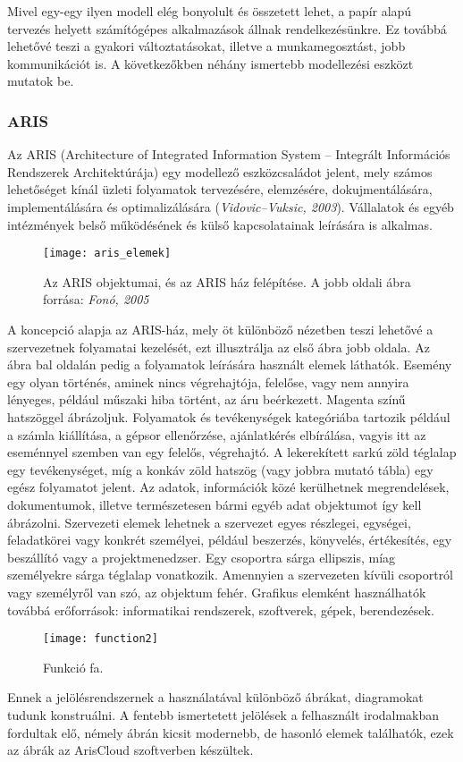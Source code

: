 \documentclass[12pt]{article}
\begin{document}
Mivel egy-egy ilyen modell elég bonyolult és összetett lehet, a papír alapú tervezés helyett számítógépes alkalmazások állnak rendelkezésünkre. Ez továbbá lehetővé teszi a gyakori változtatásokat, illetve a munkamegosztást, jobb kommunikációt is. A következőkben néhány ismertebb modellezési eszközt mutatok be.

\subsubsection{ARIS}

Az ARIS (Architecture of Integrated Information System – Integrált Információs Rendszerek Architektúrája) egy modellező eszközcsaládot jelent, mely számos lehetőséget kínál üzleti folyamatok tervezésére, elemzésére, dokujmentálására, implementálására és optimalizálására (\textit{Vidovic–Vuksic, 2003}). Vállalatok és egyéb intézmények belső működésének és külső kapcsolatainak leírására is alkalmas.

\begin{figure}
\texttt{[image: aris\_elemek]}
\caption{Az ARIS objektumai, és az ARIS ház felépítése. A jobb oldali ábra forrása:  \textit{Fonó, 2005}}
\end{figure}

A koncepció alapja az ARIS-ház, mely öt különböző nézetben teszi lehetővé a szervezetnek folyamatai kezelését, ezt illusztrálja az első ábra jobb oldala. Az ábra bal oldalán pedig  a folyamatok leírására használt elemek láthatók. Esemény egy olyan történés, aminek nincs végrehajtója, felelőse, vagy nem annyira lényeges, például műszaki hiba történt, az áru beérkezett. Magenta színű hatszöggel ábrázoljuk. Folyamatok és tevékenységek kategóriába tartozik például a számla kiállítása, a gépsor ellenőrzése, ajánlatkérés elbírálása, vagyis itt az eseménnyel szemben van egy felelős, végrehajtó. A lekerekített sarkú zöld téglalap egy tevékenységet, míg a konkáv zöld hatszög (vagy jobbra mutató tábla) egy egész folyamatot jelent. Az adatok, információk  közé kerülhetnek megrendelések, dokumentumok, illetve természetesen bármi egyéb adat objektumot így kell ábrázolni. Szervezeti elemek lehetnek a szervezet egyes részlegei, egységei, feladatkörei vagy konkrét személyei, például beszerzés, könyvelés, értékesítés, egy beszállító vagy a projektmenedzser. Egy csoportra sárga ellipszis, míag személyekre sárga téglalap vonatkozik. Amennyien a szervezeten kívüli csoportról vagy személyről van szó, az objektum fehér.  Grafikus elemként használhatók továbbá erőforrások: informatikai rendszerek, szoftverek, gépek, berendezések.
\begin{wrapfigure}{l}{0.3\textwidth}
\texttt{[image: function2]}
\caption{Funkció fa.}
\end{wrapfigure}
Ennek a jelölésrendszernek a használatával különböző ábrákat, diagramokat tudunk konstruálni. A fentebb ismertetett jelölések a felhasznált irodalmakban fordultak elő, némely ábrán kicsit modernebb, de hasonló elemek találhatók, ezek az ábrák az ArisCloud szoftverben készültek.
\end{document}
